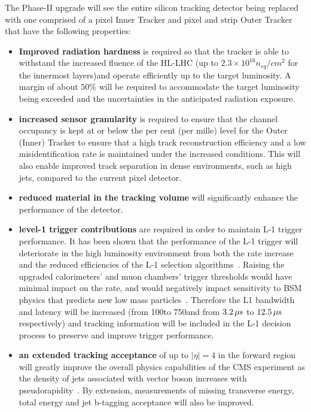 The Phase-II upgrade will see the entire silicon tracking detector being replaced with one comprised of a pixel Inner Tracker and pixel and strip Outer Tracker that have the following properties:
\begin{itemize}
\item \textbf{Improved radiation hardness} is required so that the tracker is able to withstand the increased fluence of the HL-LHC (up to $2.3\times10^{16} n_{eq}/cm^{2}$ for the innermost layers)and operate efficiently up to the target luminosity. A margin of about $50\%$ will be required to accommodate the target luminosity being exceeded and the uncertainties in the anticipated radiation exposure.
\item \textbf{increased sensor granularity} is required to ensure that the channel occupancy is kept at or below the per cent (per mille) level for the Outer (Inner) Tracker to ensure that a high track reconstruction efficiency and a low misidentification rate is maintained under the increased \PU conditions. This will also enable improved track separation in dense environments, such as high \pT jets, compared to the current pixel detector.
\item \textbf{reduced material in the tracking volume} will significantly enhance the performance of the detector.
\item \textbf{level-1 trigger contributions} are required in order to maintain L-1 trigger performance. It has been shown that the performance of the L-1 trigger will deteriorate in the high luminosity environment from both the rate increase and the reduced efficiencies of the L-1 selection algorithms~\cite{CMSCollaboration:2015zni}.
Raising the upgraded calorimeters' and muon chambers' trigger thresholds would have minimal impact on the rate, and would negatively impact sensitivity to BSM physics that predicts new low mass particles~\cite{CMSCollaboration:2015zni}.
Therefore the L1 bandwidth and latency will be increased (from 100\kHz to 750\kHz and from $3.2\,\mu\text{s}$ to $12.5\,\mu\text{s}$ respectively) and tracking information will be included in the L-1 decision process to preserve and improve trigger performance.
\item \textbf{an extended tracking acceptance} of  up to $|\eta| = 4$ in the forward region will greatly improve the overall physics capabilities of the CMS experiment as the density of jets associated with vector boson increases with pseudorapidity~\cite{CMS_Upgrade_TP}. By extension, measurements of missing transverse energy, total energy and jet b-tagging acceptance will also be improved.
\end{itemize}

